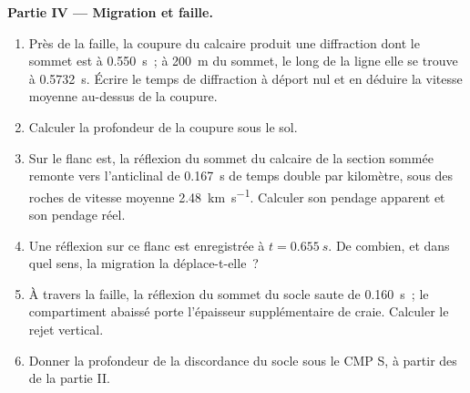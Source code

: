 \begin{problem}
\noindent\textbf{Partie IV --- Migration et faille.}
\begin{enumerate}[resume]
  \item Près de la faille, la coupure du calcaire produit une diffraction
        dont le sommet est à \qty{0.550}{s}~; à \qty{200}{m} du sommet, le long de la ligne
        elle se trouve à \qty{0.5732}{s}. Écrire le temps de diffraction à déport nul et
        en déduire la vitesse moyenne au-dessus de la coupure.
  \item Calculer la profondeur de la coupure sous le sol.
  \item Sur le flanc est, la réflexion du sommet du calcaire de la section sommée
        remonte vers l'anticlinal de \qty{0.167}{s} de temps double par
        kilomètre, sous des roches de vitesse moyenne \qty{2.48}{km.s^{-1}}. Calculer son
        pendage apparent et son pendage réel.
  \item Une réflexion sur ce flanc est enregistrée à $t = \qty{0.655}{s}$. De combien,
        et dans quel sens, la migration la déplace-t-elle~?
  \item À travers la faille, la réflexion du sommet du socle saute de \qty{0.160}{s}~;
        le compartiment abaissé porte l'épaisseur supplémentaire de craie. Calculer le
        rejet vertical.
  \item Donner la profondeur de la discordance du socle sous le CMP S, à partir des
         de la partie II.
\end{enumerate}
\end{problem}
